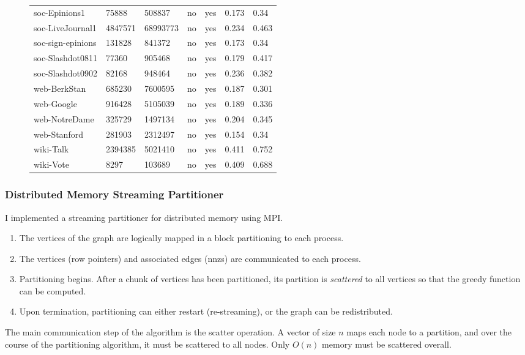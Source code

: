 \documentclass[11pt]{article}
\begin{document}
\begin{figure}
{\begin{tabular}{ *7l }
soc-Epinions1 & 75888 & 508837 & no & yes & 0.173&0.34\\ 
soc-LiveJournal1 & 4847571 & 68993773 & no & yes &0.234& 0.463\\ 
soc-sign-epinions & 131828 & 841372 & no & yes &0.173&0.34\\ 
soc-Slashdot0811 & 77360 & 905468 & no & yes &0.179&0.417\\ 
soc-Slashdot0902 & 82168 & 948464 & no & yes &0.236&0.382\\ 
web-BerkStan & 685230 & 7600595 & no & yes &0.187&0.301\\ 
web-Google & 916428 & 5105039 & no & yes &0.189&0.336\\ 
web-NotreDame & 325729 & 1497134 & no & yes &0.204&0.345\\ 
web-Stanford & 281903 & 2312497 & no & yes &0.154&0.34\\ 
wiki-Talk & 2394385 & 5021410 & no & yes &0.411&0.752\\ 
wiki-Vote  & 8297 & 103689 & no & yes &0.409&0.688\\ 
 \hline
\end{tabular}\par
}
\end{figure}

\subsubsection{Distributed Memory Streaming Partitioner}
I implemented a streaming partitioner for distributed memory using MPI.

\begin{enumerate}
\item The vertices of the graph are logically mapped in a block partitioning to each process.
\item The vertices (row pointers) and associated edges (nnzs) are communicated to each process.
\item Partitioning begins. After a chunk of vertices has been partitioned, its partition is \textit{scattered} to all vertices so that the greedy function can be computed.
\item Upon termination, partitioning can either restart (re-streaming), or the graph can be redistributed.
\end{enumerate}

The main communication step of the algorithm is the scatter operation. A vector of size $n$ maps each node to a partition, and over the course of the partitioning algorithm, it must be scattered to all nodes. Only $O(n)$ memory must be scattered overall.
\end{document}
